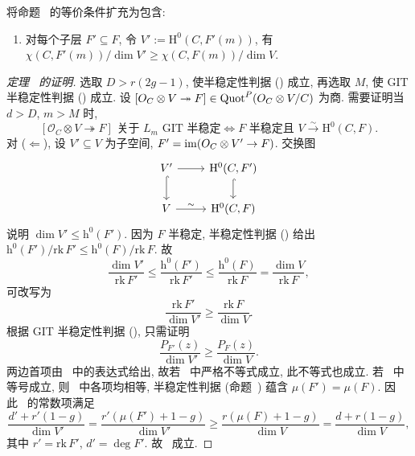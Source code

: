\begin{exercise}[不重要]\label{src:9.5.14}
将命题~ 的等价条件扩充为包含:
\begin{enumerate}[(1)]
\item[(3)] 对每个子层 $F'\subseteq F$, 令 $V':=\mathrm H^0(C,F'(m))$, 有 $\chi(C,F'(m))/\dim V'\geq\chi(C,F(m))/\dim V$.
\end{enumerate}
\end{exercise}
\begin{proof}[定理~ 的证明]
选取 $D>r(2g-1)$, 使半稳定性判据 () 成立, 再选取 $M$, 使 GIT 半稳定性判据 () 成立. 设 $[O_C\otimes V\twoheadrightarrow F]\in\operatorname{Quot}^P(O_C\otimes V/C)$ 为商. 需要证明当 $d>D$, $m>M$ 时,
\[
[\mathcal O_C\otimes V\twoheadrightarrow F]\text{ 关于 }L_m\text{ GIT 半稳定}\iff F\text{ 半稳定且 }V\xrightarrow{\sim}\mathrm H^0(C,F).
\]
对 ($\Leftarrow$), 设 $V'\subseteq V$ 为子空间, $F'=\operatorname{im}(O_C\otimes V'\to F)$. 交换图
\[
\begin{tikzcd}[ampersand replacement=\&]
V'\arrow[r]\arrow[d,hook]\&\mathrm H^0(C,F')\arrow[d,hook]\\
V\arrow[r,"\sim"]\&\mathrm H^0(C,F)
\end{tikzcd}
\]
说明 $\dim V'\leq\mathrm h^0(F')$. 因为 $F$ 半稳定, 半稳定性判据 () 给出 $\mathrm h^0(F')/\mathrm{rk}\,F'\leq\mathrm h^0(F)/\mathrm{rk}\,F$. 故
\begin{equation}\label{src:9.5.15}
\frac{\dim V'}{\mathrm{rk}\,F'}\leq\frac{\mathrm h^0(F')}{\mathrm{rk}\,F'}\leq\frac{\mathrm h^0(F)}{\mathrm{rk}\,F}=\frac{\dim V}{\mathrm{rk}\,F},
\end{equation}
可改写为
\begin{equation}\label{src:9.5.16}
\frac{\mathrm{rk}\,F'}{\dim V'}\geq\frac{\mathrm{rk}\,F}{\dim V}.
\end{equation}
根据 GIT 半稳定性判据 (), 只需证明
\begin{equation}\label{src:9.5.17}
\frac{P_{F'}(z)}{\dim V'}\geq\frac{P_F(z)}{\dim V}.
\end{equation}
两边首项由~ 中的表达式给出, 故若~ 中严格不等式成立, 此不等式也成立. 若~ 中等号成立, 则~ 中各项均相等, 半稳定性判据 (命题~) 蕴含 $\mu(F')=\mu(F)$. 因此~ 的常数项满足
\[
\frac{d'+r'(1-g)}{\dim V'}=\frac{r'(\mu(F')+1-g)}{\dim V'}\geq\frac{r(\mu(F)+1-g)}{\dim V}=\frac{d+r(1-g)}{\dim V},
\]
其中 $r'=\mathrm{rk}\,F'$, $d'=\deg F'$. 故~ 成立.


\end{proof}
